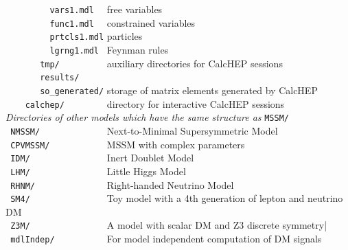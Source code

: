\documentclass[12pt,a4paper]{article}
\begin{document}
\verb|         vars1.mdl  |  free  variables   \\
\verb|         func1.mdl  |  constrained variables   \\
\verb|         prtcls1.mdl|  particles  \\
\verb|         lgrng1.mdl |   Feynman rules\\
\verb|       tmp/         | auxiliary directories for CalcHEP sessions    \\
\verb|       results/  |                                                  \\
\verb|       so_generated/|   storage  of  matrix elements generated by CalcHEP \\
\verb|    calchep/        |   directory for interactive CalcHEP sessions    \\
{\it Directories of other models which have the same structure as} {\tt  MSSM/ }\\
\verb| NMSSM/             |         Next-to-Minimal Supersymmetric Model\cite{Ellwanger:2006rn,Belanger:2005kh} \\
\verb| CPVMSSM/           |         MSSM with complex parameters\cite{Lee:2003nta,  Belanger:2006qa} \\
\verb| IDM/               |         Inert Doublet Model\cite{Barbieri:2006dq}  \\
\verb| LHM/               |         Little Higgs Model\cite{Belyaev:2006jh} \\
\verb| RHNM/              |         Right-handed Neutrino Model\cite{Belanger:2007dx}                  \\
\verb| SM4/               |            Toy model with a 4th generation of lepton and neutrino DM   \\
\verb| Z3M/               |           A model with scalar DM and Z3 discrete symmetry|\cite{Belanger:2012vp} \\
\verb| mdlIndep/          |           For model independent computation of DM signals                                 \\
\end{document}
